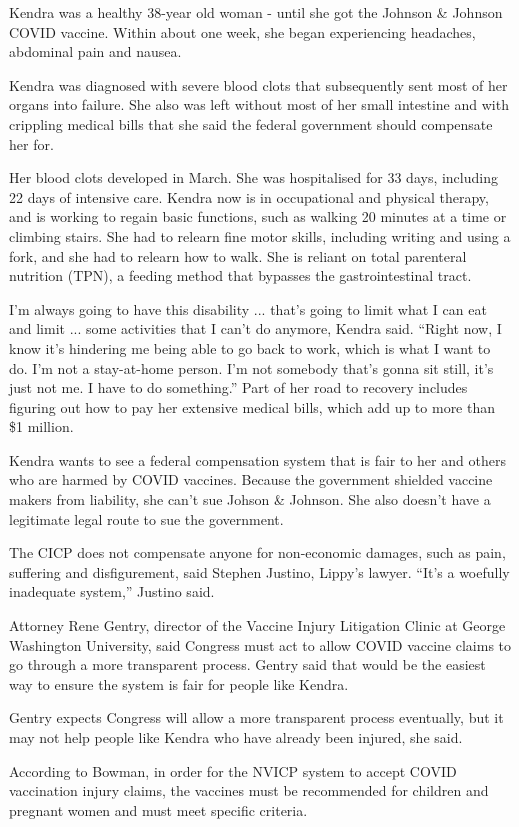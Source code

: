 Kendra was a healthy 38-year old woman - until she got the Johnson \& Johnson
COVID vaccine. Within about one week, she began experiencing headaches,
abdominal pain and nausea.

Kendra was diagnosed with severe blood clots that subsequently sent most of her
organs into failure. She also was left without most of her small intestine  and
with crippling medical bills that she said the federal government should
compensate her for.

Her blood clots developed in March. She was hospitalised for 33 days, including
22 days of intensive care.  Kendra now is in occupational and physical therapy,
and is working to regain basic functions, such as walking 20 minutes at a time
or climbing stairs. She had to relearn fine motor skills, including writing and
using a fork, and she had to relearn how to walk. She is reliant on total
parenteral nutrition (TPN), a feeding method that bypasses the gastrointestinal
tract.

I'm always going to have this disability ... that's going to limit what I can eat
and limit ... some activities that I can't do anymore, Kendra said. ``Right now, I
know it's hindering me being able to go back to work, which is what I want to
do. I'm not a stay-at-home person. I'm not somebody that's gonna sit still, it's
just not me. I have to do something.''  Part of her road to recovery includes
figuring out how to pay her extensive medical bills, which add up to more than
\$1 million.

Kendra wants to see a federal compensation system that is fair to her and others
who are harmed by COVID vaccines. Because the government shielded vaccine makers
from liability, she can't sue Johson \& Johnson. She also doesn't have a
legitimate legal route to sue the government.

The CICP does not compensate anyone for non-economic damages, such as pain,
suffering and disfigurement, said Stephen Justino, Lippy's lawyer. ``It's a
woefully inadequate system,'' Justino said.

Attorney Rene Gentry, director of the Vaccine Injury Litigation Clinic at
George Washington University, said Congress must act to allow COVID vaccine
claims to go through a more transparent process. Gentry said that would be the
easiest way to ensure the system is fair for people like Kendra.

Gentry expects Congress will allow a more transparent process eventually, but it
may not help people like Kendra who have already been injured, she said.

According to Bowman, in order for the NVICP system to accept COVID vaccination
injury claims, the vaccines must be recommended for children and pregnant women
and must meet specific criteria.

